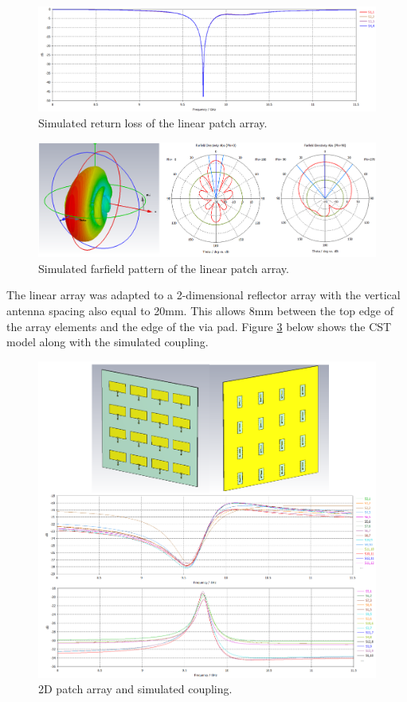     \begin{figure}[H]
    \centering
    \includegraphics[width=0.99\linewidth]{Figures/chp3_linear_array_S11.png}
    \caption{Simulated return loss of the linear patch array.}
    \label{fig:chp3_linear_array_S11}
    \end{figure}

    \begin{figure}[H]
    \centering
    \includegraphics[width=0.8\linewidth]{Figures/chp3_linear_array_pattern.png}
    \caption{Simulated farfield pattern of the linear patch array.}
    \label{fig:chp3_linear_array_pattern}
    \end{figure}

The linear array was adapted to a 2-dimensional reflector array with the vertical antenna spacing also equal to 20mm. This allows 8mm between the top edge of the array elements and the edge of the via pad. Figure \ref{fig:chp3_2D_array_combined} below shows the CST model along with the simulated coupling. 

    \begin{figure}[H]
    \centering
    \includegraphics[width=0.99\linewidth]{Figures/chp3_2D_array_combined.png}
    \caption{2D patch array and simulated coupling.}
    \label{fig:chp3_2D_array_combined}
    \end{figure}

